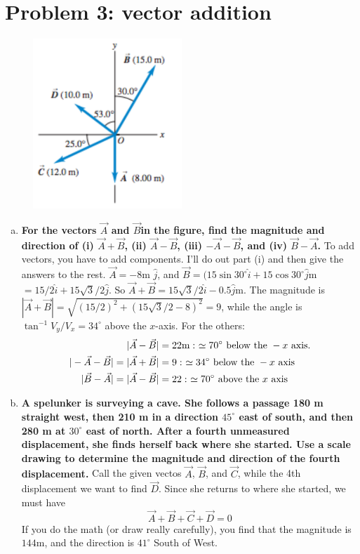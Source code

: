 \documentclass[10pt,letter]{article}
\begin{document}
\section*{Problem 3: vector addition}
\begin{figure}[!ht]
  \centering
    \includegraphics[width=0.5\textwidth]{fig1.png}
\end{figure}
\begin{enumerate}[(a)]
\item {\bf For the vectors $\vec{A}$ and $\vec{B} $in the figure, find the magnitude and direction of (i) $\vec{A} + \vec{B}$, (ii) $\vec{A} - \vec{B}$, (iii) $-\vec{A} - \vec{B}$, and (iv) $\vec{B} - \vec{A}$.}
\hspace{2pt}
To add vectors, you have to add components. I'll do out part (i) and then give the answers to the rest.
$\vec{A} = -8$m $\hat{j}$, and $\vec{B} = (15 \sin 30^\circ \hat{i} + 15 \cos 30^\circ \hat{j}$m $= 15/2 \hat{i} + 15\sqrt{3}/2 \hat{j}$. So $\vec{A} + \vec{B} = 15\sqrt{3}/2 \hat{i} - 0.5 \hat{j}$m. The magnitude is $|\vec{A} + \vec{B}| = \sqrt{(15/2)^2 + (15 \sqrt{3}/2 - 8)^2} = 9$, while the angle is $\tan^{-1}{V_y/V_x} = 34^\circ$ above the $x$-axis. For the others:
\begin{align}
|\vec{A} - \vec{B}| &= 22 {\rm m} :\, \, \simeq 70^\circ \text{ below the }-x \text{ axis.}\\
|-\vec{A} - \vec{B} | = |\vec{A} + \vec{B}| &= 9 :\,  \, \simeq 34^\circ \text{ below the }-x \text{ axis}\\
|\vec{B} - \vec{A}| = |\vec{A} - \vec{B}| &= 22 :\,  \, \simeq 70^\circ \text{ above the }x \text{ axis}
\end{align}
\item {\bf A spelunker is surveying a cave. She follows a passage 180 m straight west, then 210 m in a direction $45^\circ$ east of south, and then 280 m at $30^\circ$ east of north. After a fourth unmeasured displacement, she finds herself back where she started. Use a scale drawing to determine the magnitude and direction of the fourth displacement.}
Call the given vectos $\vec{A}$, $\vec{B}$, and $\vec{C}$, while the 4th displacement we want to find $\vec{D}$. Since she returns to where she started, we must have 
\begin{equation*}
\vec{A} + \vec{B} +\vec{C} + \vec{D} = 0
\end{equation*}
If you do the math (or draw really carefully), you find that the magnitude is $144$m, and the direction is $41^\circ$ South of West.
\end{enumerate}
\end{document}
